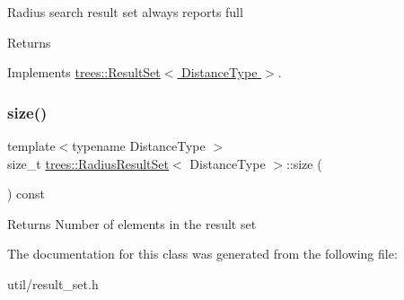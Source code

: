 Radius search result set always reports full \begin{DoxyReturn}{Returns}

\end{DoxyReturn}


Implements \hyperlink{classtrees_1_1_result_set}{trees\+::\+Result\+Set$<$ Distance\+Type $>$}.

\mbox{\label{classtrees_1_1_radius_result_set_a4ac769fcfb64d84d46d0eb233d4681da}} 
\subsubsection{\texorpdfstring{size()}{size()}}
{\footnotesize\ttfamily template$<$typename Distance\+Type $>$ \\
size\+\_\+t \hyperlink{classtrees_1_1_radius_result_set}{trees\+::\+Radius\+Result\+Set}$<$ Distance\+Type $>$\+::size (\begin{DoxyParamCaption}{ }\end{DoxyParamCaption}) const\hspace{0.3cm}{\ttfamily [inline]}}

\begin{DoxyReturn}{Returns}
Number of elements in the result set 
\end{DoxyReturn}


The documentation for this class was generated from the following file\+:\begin{DoxyCompactItemize}
\item 
util/result\+\_\+set.\+h\end{DoxyCompactItemize}
